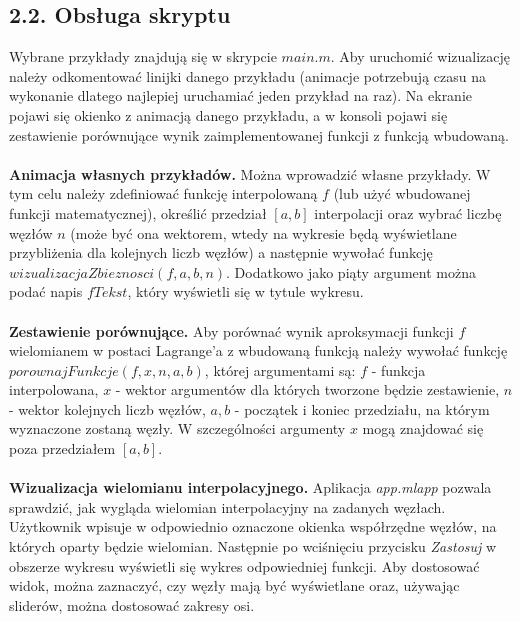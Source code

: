 \documentclass{article}
\begin{document}
	\subsection*{2.2. Obsługa skryptu}
	Wybrane przykłady znajdują się w skrypcie $main.m$. Aby uruchomić wizualizację należy odkomentować linijki danego przykładu (animacje potrzebują czasu na wykonanie dlatego najlepiej uruchamiać jeden przykład na raz). Na ekranie pojawi się okienko z animacją danego przykładu, a w konsoli pojawi się zestawienie porównujące wynik zaimplementowanej funkcji z funkcją wbudowaną.\\\\
	\textbf{Animacja własnych przykładów.}
	Można wprowadzić własne przykłady. W tym celu należy zdefiniować funkcję interpolowaną $f$ (lub użyć wbudowanej funkcji matematycznej), określić przedział $[a, b]$ interpolacji oraz wybrać liczbę węzłów $n$ (może być ona wektorem, wtedy na wykresie będą wyświetlane przybliżenia dla kolejnych liczb węzłów) a następnie wywołać funkcję $wizualizacjaZbieznosci(f, a, b, n)$. Dodatkowo jako piąty argument można podać napis $fTekst$, który wyświetli się w tytule wykresu.\\\\
	\textbf{Zestawienie porównujące.}
	Aby porównać wynik aproksymacji funkcji $f$ wielomianem w postaci Lagrange'a z wbudowaną funkcją należy wywołać funkcję $porownajFunkcje(f, x, n, a, b)$, której argumentami są: $f$ - funkcja interpolowana, $x$ - wektor argumentów dla których tworzone będzie zestawienie, $n$ - wektor kolejnych liczb węzłów, $a, b$ - początek i koniec przedziału, na którym wyznaczone zostaną węzły. W szczególności argumenty $x$ mogą znajdować się poza przedziałem $[a, b]$.\\\\
	\textbf{Wizualizacja wielomianu interpolacyjnego.}
	Aplikacja \textit{app.mlapp} pozwala sprawdzić, jak wygląda wielomian interpolacyjny na zadanych węzłach. Użytkownik wpisuje w odpowiednio oznaczone okienka współrzędne węzłów, na których oparty będzie wielomian. Następnie po wciśnięciu przycisku \textit{Zastosuj} w obszerze wykresu wyświetli się wykres odpowiedniej funkcji. Aby dostosować widok, można zaznaczyć, czy węzły mają być wyświetlane oraz, używając sliderów, można dostosować zakresy osi.
	
\end{document}
